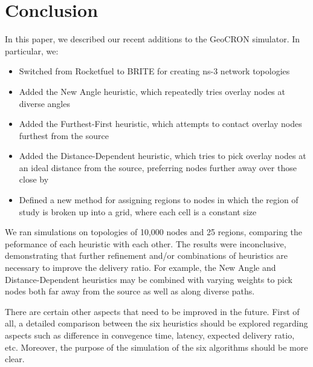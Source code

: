 \documentclass[conference]{IEEEtran}
\begin{document}
\newpage

\section{Conclusion}
In this paper, we described our recent additions to the GeoCRON simulator.
In particular, we:

\begin{itemize}
 \item Switched from Rocketfuel to BRITE for creating ns-3 network topologies
\item Added the New Angle heuristic, which repeatedly tries overlay nodes at diverse angles
\item Added the Furthest-First heuristic, which attempts to contact overlay nodes furthest from the source
\item Added the Distance-Dependent heuristic, which tries to pick overlay nodes at an ideal distance from the source, preferring nodes further away over those close by
\item Defined a new method for assigning regions to nodes in which the region of study is broken up into a grid, where each cell is a constant size
\end{itemize}

We ran simulations on topologies of 10,000 nodes and 25 regions, comparing the peformance of each heuristic with each other.
The results were inconclusive, demonstrating that further refinement and/or combinations of heuristics are necessary to improve the delivery ratio.
For example, the New Angle and Distance-Dependent heuristics may be combined with varying weights to pick nodes both far away from the source as well as along diverse paths.

There are certain other aspects that need to be improved in the future.
First of all, a detailed comparison between the six heuristics should be explored regarding aspects such as difference in convegence time, latency, expected delivery ratio, etc.
Moreover, the purpose of the simulation of the six algorithms should be more clear.




\end{document}
